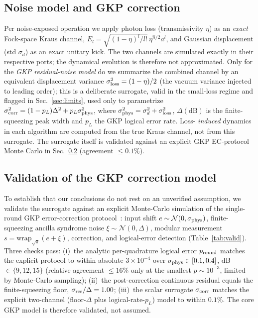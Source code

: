 \documentclass[aps,pra,reprint,superscriptaddress,nofootinbib]{revtex4-2}
\begin{document}
\subsection{Noise model and GKP correction}
Per noise-exposed operation we apply photon loss (transmissivity $\eta$) as
an \emph{exact} Fock-space Kraus channel,
$E_l=\sqrt{(1-\eta)^l/l!}\,\eta^{\hat n/2}a^l$, and Gaussian displacement
(std $\sigma_d$) as an exact unitary kick. The two channels are simulated
exactly in their respective ports; the dynamical evolution is therefore not
approximated. Only for the \emph{GKP residual-noise model} do we summarize the
combined channel by an equivalent displacement variance
$\sigma_{\rm loss}^2=(1-\eta)/2$ (the vacuum variance injected to leading
order); this is a deliberate surrogate, valid in the small-loss regime and
flagged in Sec.~\ref{sec:limits}, used only to parametrize
$\sigma_{\rm corr}^2=(1-p_L)\Delta^2+p_L\sigma_{\rm phys}^2$, where
$\sigma_{\rm phys}^2=\sigma_d^2+\sigma_{\rm loss}^2$, $\Delta(\mathrm{dB})$ is
the finite-squeezing peak width and $p_L$ the GKP logical error rate. Loss-
\emph{induced} dynamics in each algorithm are computed from the true Kraus
channel, not from this surrogate. The surrogate itself is validated against an
explicit GKP EC-protocol Monte Carlo in Sec.~\ref{sec:valid}
(agreement $\le0.1\%$).

\subsection{Validation of the GKP correction model}\label{sec:valid}
To establish that our conclusions do not rest on an unverified assumption, we
validate the surrogate against an explicit Monte-Carlo simulation of the
single-round GKP error-correction protocol~\cite{Glancy2006,GKP2001}: input
shift
$e\sim\mathcal N(0,\sigma_{\rm phys})$, finite-squeezing ancilla syndrome noise
$\xi\sim\mathcal N(0,\Delta)$, modular measurement
$s=\mathrm{wrap}_{\sqrt\pi}(e+\xi)$, correction, and logical-error detection
(Table~\ref{tab:valid}). Three checks pass: (i)~the analytic per-quadrature
logical error $p_{\rm round}$ matches the explicit protocol to within absolute
$3\times10^{-4}$ over $\sigma_{\rm phys}\in[0.1,0.4]$, dB$\in\{9,12,15\}$
(relative agreement $\le16\%$ only at the smallest $p\sim10^{-3}$, limited by
Monte-Carlo sampling); (ii)~the post-correction continuous residual equals the
finite-squeezing floor, $\sigma_{\rm res}/\Delta=1.00$; (iii)~the scalar
surrogate $\sigma_{\rm corr}$ matches the explicit two-channel
(floor-$\Delta$ plus logical-rate-$p_L$) model to within $0.1\%$. The core GKP
model is therefore validated, not assumed.
\end{document}
